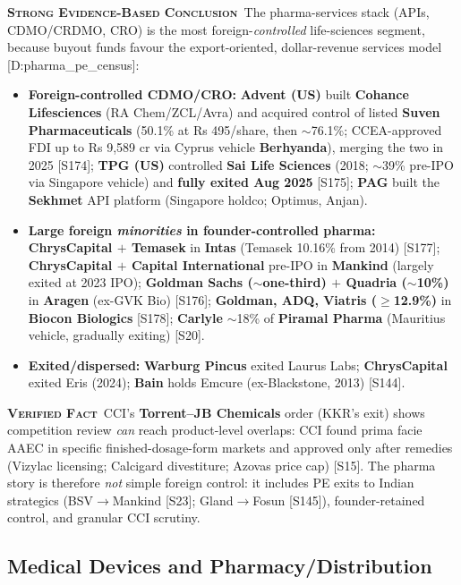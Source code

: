 \documentclass[11pt,a4paper]{article}
\newcommand{\VF}{\textcolor{vfcol}{\textsc{\textbf{Verified Fact}}}}
\newcommand{\SE}{\textcolor{secol}{\textsc{\textbf{Strong Evidence-Based Conclusion}}}}
\newcommand{\cs}[1]{\textnormal{[#1]}}
\begin{document}
\SE\ The pharma-services stack (APIs, CDMO/CRDMO, CRO) is the most foreign-\emph{controlled} life-sciences segment, because buyout funds favour the export-oriented, dollar-revenue services model \cs{D:pharma\_pe\_census}:
\begin{itemize}[leftmargin=1.4em,itemsep=2pt]
\item \textbf{Foreign-controlled CDMO/CRO:} \textbf{Advent (US)} built \textbf{Cohance Lifesciences} (RA Chem/ZCL/Avra) and acquired control of listed \textbf{Suven Pharmaceuticals} (50.1\% at Rs 495/share, then $\sim$76.1\%; CCEA-approved FDI up to Rs 9{,}589 cr via Cyprus vehicle \textbf{Berhyanda}), merging the two in 2025 \cs{S174}; \textbf{TPG (US)} controlled \textbf{Sai Life Sciences} (2018; $\sim$39\% pre-IPO via Singapore vehicle) and \textbf{fully exited Aug 2025} \cs{S175}; \textbf{PAG} built the \textbf{Sekhmet} API platform (Singapore holdco; Optimus, Anjan).
\item \textbf{Large foreign \emph{minorities} in founder-controlled pharma:} \textbf{ChrysCapital $+$ Temasek} in \textbf{Intas} (Temasek 10.16\% from 2014) \cs{S177}; \textbf{ChrysCapital $+$ Capital International} pre-IPO in \textbf{Mankind} (largely exited at 2023 IPO); \textbf{Goldman Sachs ($\sim$one-third) $+$ Quadria ($\sim$10\%)} in \textbf{Aragen} (ex-GVK Bio) \cs{S176}; \textbf{Goldman, ADQ, Viatris ($\ge$12.9\%)} in \textbf{Biocon Biologics} \cs{S178}; \textbf{Carlyle} $\sim$18\% of \textbf{Piramal Pharma} (Mauritius vehicle, gradually exiting) \cs{S20}.
\item \textbf{Exited/dispersed:} \textbf{Warburg Pincus} exited Laurus Labs; \textbf{ChrysCapital} exited Eris (2024); \textbf{Bain} holds Emcure (ex-Blackstone, 2013) \cs{S144}.
\end{itemize}

\VF\ CCI's \textbf{Torrent--JB Chemicals} order (KKR's exit) shows competition review \emph{can} reach product-level overlaps: CCI found prima facie AAEC in specific finished-dosage-form markets and approved only after remedies (Vizylac licensing; Calcigard divestiture; Azovas price cap) \cs{S15}. The pharma story is therefore \emph{not} simple foreign control: it includes PE exits to Indian strategics (BSV$\rightarrow$Mankind \cs{S23}; Gland$\rightarrow$Fosun \cs{S145}), founder-retained control, and granular CCI scrutiny.

\subsection{Medical Devices and Pharmacy/Distribution}
\end{document}
